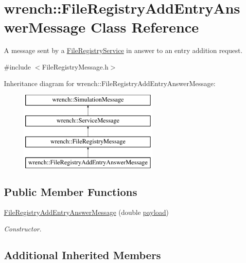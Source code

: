 \hypertarget{classwrench_1_1_file_registry_add_entry_answer_message}{}\section{wrench\+:\+:File\+Registry\+Add\+Entry\+Answer\+Message Class Reference}
\label{classwrench_1_1_file_registry_add_entry_answer_message}


A message sent by a \hyperlink{classwrench_1_1_file_registry_service}{File\+Registry\+Service} in answer to an entry addition request.  




{\ttfamily \#include $<$File\+Registry\+Message.\+h$>$}

Inheritance diagram for wrench\+:\+:File\+Registry\+Add\+Entry\+Answer\+Message\+:\begin{figure}[H]
\begin{center}
\leavevmode
\includegraphics[height=4.000000cm]{classwrench_1_1_file_registry_add_entry_answer_message}
\end{center}
\end{figure}
\subsection*{Public Member Functions}
\begin{DoxyCompactItemize}
\item 
\hyperlink{classwrench_1_1_file_registry_add_entry_answer_message_ac327ec85caa8f7a6917f42eabaf5f173}{File\+Registry\+Add\+Entry\+Answer\+Message} (double \hyperlink{classwrench_1_1_simulation_message_a914f2732713f7c02898e66f05a7cb8a1}{payload})
\begin{DoxyCompactList}\small\item\em Constructor. \end{DoxyCompactList}\end{DoxyCompactItemize}
\subsection*{Additional Inherited Members}


